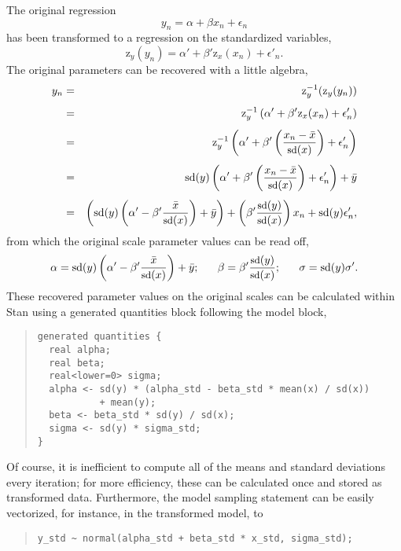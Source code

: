 The original regression
\[
y_n 
= \alpha + \beta x_n + \epsilon_n
\]
has been transformed to a regression on the standardized variables,
\[
\mbox{z}_y(y_n)
= \alpha'
+ \beta' \mbox{z}_x(x_n)
+ \epsilon'_n.
\]
The original parameters can be recovered with a little algebra,
%
\begin{eqnarray*}
y_n 
& = & \mbox{z}_y^{-1}(\mbox{z}_y(y_n))
\\[4pt]
& = & 
\mbox{z}_y^{-1} 
\left( 
\alpha' 
+ \beta' \mbox{z}_x(x_n)
+ \epsilon_n'
\right)
\\[4pt]
& = & 
\mbox{z}_y^{-1} 
\left( 
\alpha' 
+ \beta' 
    \left(  
      \frac{x_n - \bar{x}}{\mbox{\small sd}(x)}
    \right)
+ \epsilon_n'
\right)
\\[4pt]
& = & 
\mbox{sd}(y)
\left( 
\alpha' 
+ \beta' 
    \left(  
      \frac{x_n - \bar{x}}{\mbox{\small sd}(x)}
    \right)
+ \epsilon_n'
\right)
+ \bar{y}
\\[4pt]
& = & 
\left( 
  \mbox{sd}(y) 
      \left( 
          \alpha' 
          - \beta' \frac{\bar{x}}{\mbox{\small sd}(x)}
      \right) 
  + \bar{y}  
\right)
+ \left(
      \beta' \frac{\mbox{\small sd}(y)}{\mbox{\small sd}(x)} 
  \right) x_n
+ \mbox{sd}(y) \epsilon'_n,
\end{eqnarray*}
%
from which the original scale parameter values can be read off,
\[
\alpha 
=
\mbox{sd}(y) 
      \left( 
          \alpha' 
          - \beta' \frac{\bar{x}}{\mbox{\small sd}(x)}
      \right) 
  + \bar{y};
\ \ \ \ \ 
\beta = \beta' \frac{\mbox{\small sd}(y)}{\mbox{\small sd}(x)};
\ \ \ \ \
\sigma = \mbox{sd}(y) \sigma'.
\]
%
These recovered parameter values on the original scales can be
calculated within Stan using a generated quantities block following
the model block,
\begin{quote}
\begin{Verbatim}[fontsize=\small]
generated quantities {
  real alpha;
  real beta;
  real<lower=0> sigma;
  alpha <- sd(y) * (alpha_std - beta_std * mean(x) / sd(x)) 
           + mean(y);
  beta <- beta_std * sd(y) / sd(x);
  sigma <- sd(y) * sigma_std;
}
\end{Verbatim}
\end{quote}
%
Of course, it is inefficient to compute all of the means and standard
deviations every iteration; for more efficiency, these can be
calculated once and stored as transformed data.  Furthermore, the
model sampling statement can be easily vectorized, for instance, in
the transformed model, to
\begin{quote}
\begin{Verbatim}[fontsize=\small]
    y_std ~ normal(alpha_std + beta_std * x_std, sigma_std);
\end{Verbatim}
\end{quote}



